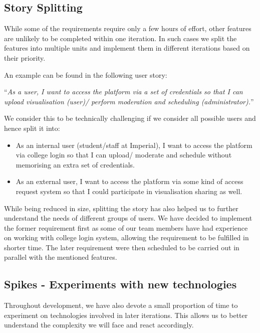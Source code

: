\documentclass[a4paper]{article}
\begin{document}
\subsection{Story Splitting}
While some of the requirements require only a few hours of effort, other features are unlikely to be completed within one iteration. In such cases we split the features into multiple units and implement them in different iterations based on their priority.

An example can be found in the following user story:
\begin{center}
``\textit{As a user, I want to access the platform via a set of
credentials so that I can upload visualisation (user)/ perform moderation and
scheduling (administrator).}''\\
\end{center}

We consider this to be technically challenging if we consider all possible users and hence split it into:

\begin{itemize}
  \item As an internal user (student/staff at Imperial), I want to access the 
        platform via college login so that I can upload/ moderate and schedule
        without memorising an extra set of credentials.
  \item As an external user, I want to access the platform via some kind
        of access request system so that I could participate in visualisation
        sharing as well. 
\end{itemize}

While being reduced in size, splitting the story has also helped us to 
further understand the needs of different groups of users. 
We have decided to implement the former requirement
first as some of our team members have had experience on working with college
login system, allowing the requirement to be fulfilled in shorter time.
The later requirement were then scheduled
to be carried out in parallel with the mentioned features.

\subsection{Spikes - Experiments with new technologies}
Throughout development, we have also devote a small proportion of time to
experiment on technologies involved in later iterations. This allows us to
better understand the complexity we will face and react accordingly.
\end{document}
